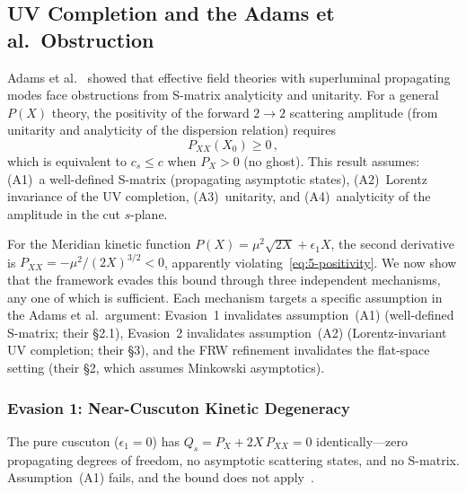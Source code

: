 \subsection{UV Completion and the Adams et al.\ Obstruction}
\label{sec:5-adams}

Adams et al.~\cite{ch5:Adams2006} showed that effective field theories with superluminal propagating modes face obstructions from S-matrix analyticity and unitarity. For a general $P(X)$ theory, the positivity of the forward $2 \to 2$ scattering amplitude (from unitarity and analyticity of the dispersion relation) requires
\begin{equation}
  P_{XX}(X_0) \geq 0\,,
  \label{eq:5-positivity}
\end{equation}
which is equivalent to $c_s \leq c$ when $P_X > 0$ (no ghost). This result assumes: (A1)~a well-defined S-matrix (propagating asymptotic states), (A2)~Lorentz invariance of the UV completion, (A3)~unitarity, and (A4)~analyticity of the amplitude in the cut $s$-plane.

For the Meridian kinetic function $P(X) = \mu^2\sqrt{2X} + \epsilon_1 X$, the second derivative is $P_{XX} = -\mu^2/(2X)^{3/2} < 0$, apparently violating~\eqref{eq:5-positivity}. We now show that the framework evades this bound through three independent mechanisms, any one of which is sufficient. Each mechanism targets a specific assumption in the Adams et al.\ argument: Evasion~1 invalidates assumption~(A1) (well-defined S-matrix; their \S2.1), Evasion~2 invalidates assumption~(A2) (Lorentz-invariant UV completion; their \S3), and the FRW refinement invalidates the flat-space setting (their \S2, which assumes Minkowski asymptotics).

\subsubsection{Evasion 1: Near-Cuscuton Kinetic Degeneracy}

The pure cuscuton ($\epsilon_1 = 0$) has $Q_s = P_X + 2X\,P_{XX} = 0$ identically---zero propagating degrees of freedom, no asymptotic scattering states, and no S-matrix. Assumption~(A1) fails, and the bound does not apply~\cite{ch5:Afshordi2007,ch5:Iyonaga2018}.

